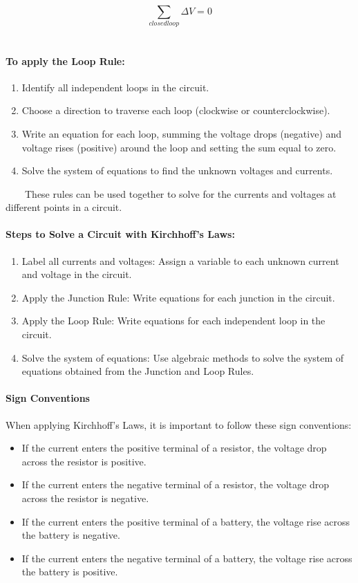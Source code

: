 \begin{equation*}
    \sum_{closed loop} \Delta V = 0
\end{equation*}\\

\paragraph*{To apply the Loop Rule:}
\begin{enumerate}
    \item Identify all independent loops in the circuit.
    \item Choose a direction to traverse each loop (clockwise or counterclockwise).
    \item Write an equation for each loop, summing the voltage drops (negative) and voltage rises (positive) around the loop and setting the sum equal to zero.
    \item Solve the system of equations to find the unknown voltages and currents.
\end{enumerate}

\ \ \ \ These rules can be used together to solve for the currents and voltages at different points in a circuit.

\hrulefill

\paragraph*{Steps to Solve a Circuit with Kirchhoff's Laws:}
\begin{enumerate}
    \item Label all currents and voltages: Assign a variable to each unknown current and voltage in the circuit.
    \item Apply the Junction Rule: Write equations for each junction in the circuit.
    \item Apply the Loop Rule: Write equations for each independent loop in the circuit.
    \item Solve the system of equations: Use algebraic methods to solve the system of equations obtained from the Junction and Loop Rules.
\end{enumerate}

\paragraph*{Sign Conventions}
When applying Kirchhoff's Laws, it is important to follow these sign conventions:
\begin{itemize}
    \item If the current enters the positive terminal of a resistor, the voltage drop across the resistor is positive.
    \item If the current enters the negative terminal of a resistor, the voltage drop across the resistor is negative.
    \item If the current enters the positive terminal of a battery, the voltage rise across the battery is negative.
    \item If the current enters the negative terminal of a battery, the voltage rise across the battery is positive.
\end{itemize}
